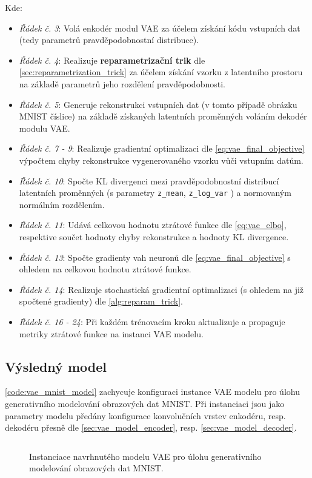 Kde:
\begin{itemize}
    \item \emph{Řádek č. 3}: Volá enkodér modul VAE za účelem získání kódu vstupních dat (tedy parametrů pravděpodobnostní distribuce).
    \item \emph{Řádek č. 4}: Realizuje \textbf{reparametrizační trik} dle \autoref{sec:reparametrization_trick} za účelem získání vzorku z latentního prostoru na základě parametrů jeho rozdělení pravděpodobnosti.
    \item \emph{Řádek č. 5}: Generuje rekonstrukci vstupních dat (v tomto případě obrázku MNIST číslice) na základě získaných latentních proměnných voláním dekodér modulu VAE.
    \item \emph{Řádek č. 7 - 9}: Realizuje gradientní optimalizaci dle \autoref{eq:vae_final_objective} výpočtem chyby rekonstrukce vygenerovaného vzorku vůči vstupním datům.
    \item \emph{Řádek č. 10}: Spočte KL divergenci mezi pravděpodobnostní distribucí latentních proměnných (s parametry \lstinline{z_mean}, \lstinline{z_log_var} ) a normovaným normálním rozdělením.
    \item \emph{Řádek č. 11}: Udává celkovou hodnotu ztrátové funkce dle \autoref{eq:vae_elbo}, respektive součet hodnoty chyby rekonstrukce a hodnoty KL divergence.
    \item \emph{Řádek č. 13}: Spočte gradienty vah neuronů dle \autoref{eq:vae_final_objective} s ohledem na celkovou hodnotu ztrátové funkce.
    \item \emph{Řádek č. 14}: Realizuje stochastická gradientní optimalizaci (s ohledem na již spočtené gradienty) dle \autoref{alg:reparam_trick}.
    \item \emph{Řádek č. 16 - 24}: Při každém trénovacím kroku aktualizuje a propaguje metriky ztrátové funkce na instanci VAE modelu.
\end{itemize}

\subsection{Výsledný model}
\label{sec:vae_prepared_model}
\autoref{code:vae_mnist_model} zachycuje konfiguraci instance VAE modelu pro úlohu generativního modelování obrazových dat MNIST.
Při instanciaci jsou jako parametry modelu předány konfigurace konvolučních vrstev enkodéru, resp. dekodéru přesně dle \autoref{sec:vae_model_encoder}, resp. \autoref{sec:vae_model_decoder}.

\begin{figure}[H]
    \inputminted[linenos]{python}{code_snippets/vae_model.py}
    \caption{Instanciace navrhnutého modelu VAE pro úlohu generativního modelování obrazových dat MNIST.}
    \label{code:vae_mnist_model}
\end{figure}

